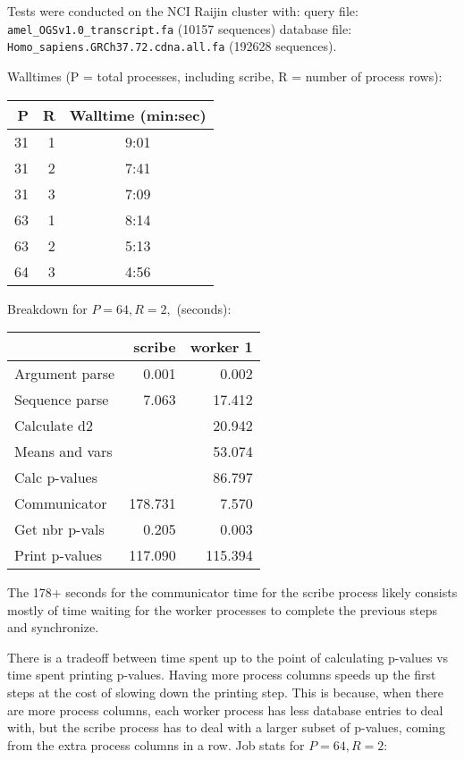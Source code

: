 \documentclass[11pt]{report}
\begin{document}
Tests were conducted on the NCI Raijin cluster with:
query file: 
\newline
\verb!amel_OGSv1.0_transcript.fa! (10157 sequences)
database file: 
\newline
\verb!Homo_sapiens.GRCh37.72.cdna.all.fa! (192628 sequences).

Walltimes (P = total processes, including scribe, R = number of process rows):

\begin{center}
\begin{tabular}{|rrc|}
\hline
P  &R &Walltime (min:sec) \\
\hline
31 &1 &9:01 \\
31 &2 &7:41 \\
31 &3 &7:09 \\
63 &1 &8:14 \\
63 &2 &5:13 \\
64 &3 &4:56 \\
\hline
\end{tabular} 
\end{center}

Breakdown for $P=64, R=2,$ (seconds):

\begin{center}
\begin{tabular}{|l|rr|}
\hline
               &scribe  &worker 1 \\
\hline
Argument parse &  0.001 &  0.002 \\
Sequence parse &  7.063 & 17.412 \\
Calculate d2   &        & 20.942 \\
Means and vars &        & 53.074 \\
Calc p-values  &        & 86.797 \\
Communicator   &178.731 &  7.570 \\
Get nbr p-vals &  0.205 &  0.003 \\
Print p-values &117.090 &115.394 \\
\hline
\end{tabular} 
\end{center}

The 178+ seconds for the communicator time for the scribe process likely 
consists mostly of time waiting for the worker processes to complete the 
previous steps and synchronize.

There is a tradeoff between time spent up to the point of calculating p-values 
vs time spent printing p-values. Having more process columns speeds up the 
first steps at the cost of slowing down the printing step. This is because, 
when there are more process columns, each worker process has less database 
entries to deal with, but the scribe process has to deal with a larger subset 
of p-values, coming from the extra process columns in a row.
\newpage
Job stats for $P=64, R=2$:
\end{document}
